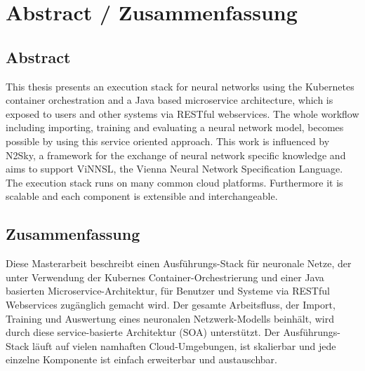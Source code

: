 \hypertarget{abstract-zusammenfassung}{%
\chapter*{Abstract / Zusammenfassung}\label{abstract-zusammenfassung}}

\hypertarget{abstract}{%
\section*{Abstract}\label{abstract}}

This thesis presents an execution stack for neural networks using the
Kubernetes container orchestration and a Java based microservice
architecture, which is exposed to users and other systems via RESTful
webservices. The whole workflow including importing, training and
evaluating a neural network model, becomes possible by using this
service oriented approach. This work is influenced by N2Sky, a framework
for the exchange of neural network specific knowledge and aims to
support ViNNSL, the Vienna Neural Network Specification Language. The
 execution stack runs on many common cloud platforms.
Furthermore it is scalable and each component is extensible and
interchangeable.

\hypertarget{zusammenfassung}{%
\section*{Zusammenfassung}\label{zusammenfassung}}

Diese Masterarbeit beschreibt einen Ausführungs-Stack für neuronale
Netze, der unter Verwendung der Kubernes Container-Orchestrierung und
einer Java basierten Microservice-Architektur, für Benutzer und Systeme
via RESTful Webservices zugänglich gemacht wird. Der gesamte
Arbeitsfluss, der Import, Training und Auswertung eines neuronalen
Netzwerk-Modells beinhält, wird durch diese service-basierte Architektur
(SOA) unterstützt. Der Ausführungs-Stack läuft auf vielen namhaften
Cloud-Umgebungen, ist skalierbar und jede einzelne Komponente ist
einfach erweiterbar und austauschbar.
